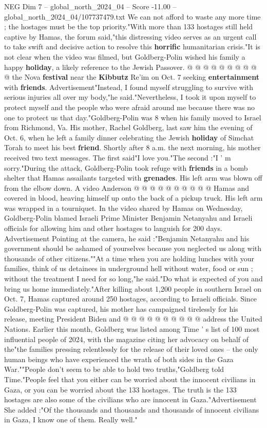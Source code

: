 \begin{textsample}{NEG Dim 7 – global\_north\_2024\_04 – Score -11.00 – global\_north\_2024\_04/107737479.txt}
We can not afford to waste any more time ; the hostages must be the top priority."With more than 133 hostages still held captive by Hamas, the forum said,"this distressing video serves as an urgent call to take swift and decisive action to resolve this \textbf{horrific} humanitarian crisis."It is not clear when the video was filmed, but Goldberg-Polin wished his family a happy \textbf{holiday}, a likely reference to the Jewish Passover. @ @ @ @ @ @ @ @ @ @ the Nova \textbf{festival} near the \textbf{Kibbutz} Re'im on Oct. 7 seeking \textbf{entertainment} with \textbf{friends}.
Advertisement"Instead, I found myself struggling to survive with serious injuries all over my body,"he said."Nevertheless, I took it upon myself to protect myself and the people who were afraid around me because there was no one to protect us that day."Goldberg-Polin was 8 when his family moved to Israel from Richmond, Va.
His mother, Rachel Goldberg, last saw him the evening of Oct. 6, when he left a family dinner celebrating the Jewish \textbf{holiday} of Simchat Torah to meet his best \textbf{friend}.
Shortly after 8 a.m. the next morning, his mother received two text messages.
The first said"I love you."The second :"I ' m sorry."During the attack, Goldberg-Polin took refuge with \textbf{friends} in a bomb shelter that Hamas assailants targeted with \textbf{grenades}.
His left arm was blown off from the elbow down.
A video Anderson @ @ @ @ @ @ @ @ @ @ Hamas and covered in blood, heaving himself up onto the back of a pickup truck.
His left arm was wrapped in a tourniquet.
In the video shared by Hamas on Wednesday, Goldberg-Polin blamed Israeli Prime Minister Benjamin Netanyahu and Israeli officials for allowing him and other hostages to languish for 200 days.
Advertisement Pointing at the camera, he said :"Benjamin Netanyahu and his government should be ashamed of yourselves because you neglected us along with thousands of other citizens.""At a time when you are holding lunches with your families, think of us detainees in underground hell without water, food or sun ; without the treatment I need for so long,"he said."Do what is expected of you and bring us home immediately."After killing about 1,200 people in southern Israel on Oct. 7, Hamas captured around 250 hostages, according to Israeli officials.
Since Goldberg-Polin was captured, his mother has campaigned tirelessly for his release, meeting President Biden and @ @ @ @ @ @ @ @ @ @ address the United Nations.
Earlier this month, Goldberg was listed among Time ' s list of 100 most influential people of 2024, with the magazine citing her advocacy on behalf of the"the families pressing relentlessly for the release of their loved ones -- the only human beings who have experienced the wrath of both sides in the Gaza War.""People don't seem to be able to hold two truths,"Goldberg told Time."People feel that you either can be worried about the innocent civilians in Gaza, or you can be worried about the 133 hostages.
The truth is the 133 hostages are also some of the civilians who are innocent in Gaza."Advertisement She added :"Of the thousands and thousands and thousands of innocent civilians in Gaza, I know one of them.
Really well."


\end{textsample}
